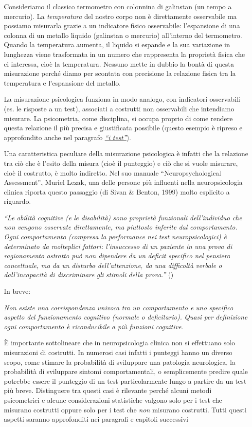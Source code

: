 \documentclass[
  italian,
  letterpaper,
  paper=A4,
  headinclude=on,
  footinclude=on,
  12pt]{scrbook}
\begin{document}
Consideriamo il classico termometro con colonnina di galinstan (un tempo
a mercurio). La \emph{temperatura} del nostro corpo non è direttamente
osservabile ma possiamo misurarla grazie a un indicatore fisico
osservabile: l'espansione di una colonna di un metallo liquido
(galinstan o mercurio) all'interno del termometro. Quando la temperatura
aumenta, il liquido si espande e la sua variazione in lunghezza viene
trasformata in un numero che rappresenta la proprietà fisica che ci
interessa, cioè la temperatura. Nessuno mette in dubbio la bontà di
questa misurazione perché diamo per scontata con precisione la relazione
fisica tra la temperatura e l'espansione del metallo.

La misurazione psicologica funziona in modo analogo, con indicatori
osservabili (es. le risposte a un test), associati a costrutti non
osservabili che intendiamo misurare. La psicometria, come disciplina, si
occupa proprio di come rendere questa relazione il più precisa e
giustificata possibile (questo esempio è ripreso e approfondito anche
nel paragrafo \hyperref[i-test]{\emph{``i test''}}).

Una caratteristica peculiare della misurazione psicologica è infatti che
la relazione tra ciò che è l'esito della misura (cioè il punteggio) e
ciò che si vuole misurare, cioè il costrutto, è molto indiretto. Nel suo
manuale ``Neuropsychological Assessment'', Muriel Lezak, una delle
persone più influenti nella neuropsicologia clinica riporta questo
passaggio (di Sivan \& Benton, 1999) molto esplicito a riguardo.

\emph{``Le abilità cognitive (e le disabilità) sono proprietà funzionali
dell'individuo che non vengono osservate direttamente, ma piuttosto
inferite dal comportamento. Ogni comportamento (compresa la performance
nei test neuropsicologici) è determinato da molteplici fattori:
l'insuccesso di un paziente in una prova di ragionamento astratto può
non dipendere da un deficit specifico nel pensiero concettuale, ma da un
disturbo dell'attenzione, da una difficoltà verbale o dall'incapacità di
discriminare gli stimoli della prova.''} (\cite{sivan1999cognitive})

In breve:

\emph{Non esiste una corrispondenza univoca tra un comportamento e uno
specifico aspetto del funzionamento cognitivo (normale o deficitario).
Quasi per definizione ogni comportamento è riconducibile a più funzioni
cognitive}.

È importante sottolineare che in neuropsicologia clinica non si
effettuano solo misurazioni di costrutti. In numerosi casi infatti i
punteggi hanno un diverso scopo, come stimare la probabilità di
sviluppare una patologia neurologica, la probabilità di sviluppare
sintomi comportamentali, o semplicemente predire quale potrebbe essere
il punteggio di un test particolarmente lungo a partire da un test più
breve. Distinguere tra questi casi è rilevante perché alcuni metodi
psicometrici e alcune considerazioni statistiche valgono solo per i test
che misurano costrutti oppure solo per i test che \emph{non} misurano
costrutti. Tutti questi aspetti saranno approfonditi nei paragrafi e
capitoli successivi
\end{document}
